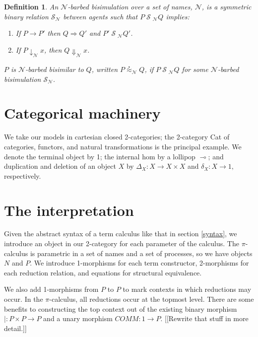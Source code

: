 \documentclass[]{acm_proc_article-sp}
\newcommand{\maps}{\colon}
\renewcommand{\red}{\rightarrow}
\newcommand{\wred}{\Rightarrow}
\newcommand{\rel}[1]{\;{\mathcal #1}\;} %
\newcommand{\wbbisim}{\stackrel{\centerdot}{\approx}} %
\newtheorem{defn}[thm]{Definition}
\numberwithin{equation}{subsection}
\newcommand{\pic}{$\pi$-calculus}
\begin{document}
\begin{defn}
An  ${\mathcal N}$-\emph{barbed bisimulation} over a set of names, ${\mathcal N}$, is a symmetric binary relation 
${\mathcal S}_{\mathcal N}$ between agents such that $P\rel{S}_{\mathcal N}Q$ implies:
\begin{enumerate}
\item If $P \red P'$ then $Q \wred Q'$ and $P'\rel{S}_{\mathcal N} Q'$.
\item If $P\downarrow_{\mathcal N} x$, then $Q\Downarrow_{\mathcal N} x$.
\end{enumerate}
$P$ is ${\mathcal N}$-barbed bisimilar to $Q$, written
$P \wbbisim_{\mathcal N} Q$, if $P \rel{S}_{\mathcal N} Q$ for some ${\mathcal N}$-barbed bisimulation ${\mathcal S}_{\mathcal N}$.
\end{defn}

\section{Categorical machinery}

We take our models in cartesian closed 2-categories; the 2-category Cat of categories, functors, and natural transformations is the principal example.  We denote the terminal object by 1; the internal hom by a lollipop $\multimap$; and duplication and deletion of an object $X$ by $\Delta_X:X \to X \times X$ and $\delta_X:X \to 1,$ respectively.

\section{The interpretation}

Given the abstract syntax of a term calculus like that in section \ref{syntax}, we introduce an object in our 2-category for each parameter of the calculus.  The {\pic} is parametric in a set of names and a set of processes, so we have objects $N$ and $P$.  We introduce 1-morphisms for each term constructor, 2-morphisms for each reduction relation, and equations for structural equivalence.

We also add 1-morphisms from $P$ to $P$ to mark contexts in which reductions may occur.  In the {\pic,} all reductions occur at the topmost level.  There are some benefits to constructing the top context out of the existing binary morphism $|\maps P \times P \to P$ and a unary morphism $COMM\maps 1 \to P.$ [[Rewrite that stuff in more detail.]]
\end{document}

